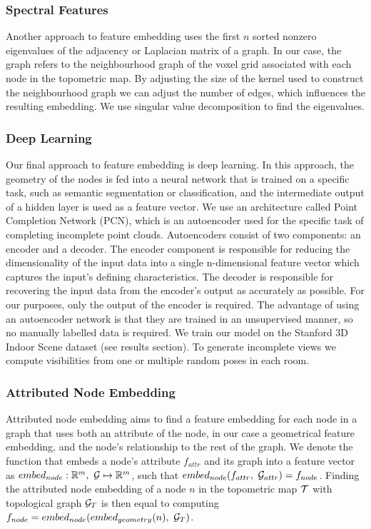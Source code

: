 \subsubsection{Spectral Features}
Another approach to feature embedding uses the first \(n\) sorted nonzero eigenvalues of the adjacency or Laplacian matrix of a graph. In our case, the graph refers to the neighbourhood graph of the voxel grid associated with each node in the topometric map. By adjusting the size of the kernel used to construct the neighbourhood graph we can adjust the number of edges, which influences the resulting embedding. We use singular value decomposition to find the eigenvalues.

\subsubsection{Deep Learning}
Our final approach to feature embedding is deep learning. In this approach, the geometry of the nodes is fed into a neural network that is trained on a specific task, such as semantic segmentation or classification, and the intermediate output of a hidden layer is used as a feature vector. We use an architecture called Point Completion Network (PCN), which is an autoencoder used for the specific task of completing incomplete point clouds. Autoencoders consist of two components: an encoder and a decoder. The encoder component is responsible for reducing the dimensionality of the input data into a single n-dimensional feature vector which captures the input's defining characteristics. The decoder is responsible for recovering the input data from the encoder's output as accurately as possible. For our purposes, only the output of the encoder is required. The advantage of using an autoencoder network is that they are trained in an unsupervised manner, so no manually labelled data is required. We train our model on the Stanford 3D Indoor Scene dataset (see results section). To generate incomplete views we compute visibilities from one or multiple random poses in each room.

\subsubsection{Attributed Node Embedding}
Attributed node embedding aims to find a feature embedding for each node in a graph that uses both an attribute of the node, in our case a geometrical feature embedding, and the node's relationship to the rest of the graph. We denote the function that embeds a node's attribute \(f_{attr}\) and its graph into a feature vector as \(embed_{node}: \mathbb{R}^m,\ \mathcal{G} \mapsto \mathbb{R}^m\), such that \(embed_{node}(f_{attr},\ \mathcal{G}_{attr}) = f_{node}\). Finding the attributed node embedding of a node \(n\) in the topometric map \(\mathcal{T}\) with topological graph \(\mathcal{G}_{T}\) is then equal to computing \(f_{node}=embed_{node}(embed_{geometry}(n),\ \graph_{T})\). 

